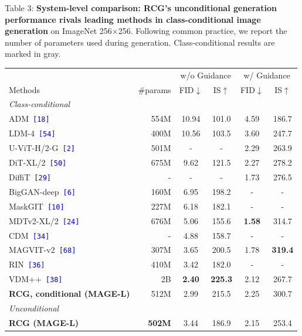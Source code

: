 \documentclass[10pt]{article}
\newcommand{\gc}[1]{\textcolor{resultgray}{#1}}
\begin{document}
\graphicspath{{assets/}}
\noindent\parbox{\linewidth}{Table 3: \textbf{System-level comparison: RCG's unconditional generation performance rivals leading methods in class-conditional image generation} on ImageNet 256$\times$256. Following common practice, we report the number of parameters used during generation. Class-conditional results are marked in gray.}\par
\vspace{6pt}
\centering
\begin{tabular}{@{}lr|cc|cc@{}}
 & & \multicolumn{2}{|c|}{w/o Guidance} & \multicolumn{2}{c}{w/ Guidance} \\
 Methods & \#params & FID$\downarrow$ & IS$\uparrow$ & FID$\downarrow$ & IS$\uparrow$ \\
 \toprule
 \multicolumn{2}{l|}{\textit{Class-conditional}} & & & & \\
 \gc{ADM~\textcolor{blue}{\texttt{[18]}}} & \gc{554M} & \gc{10.94} & \gc{101.0} & \gc{4.59} & \gc{186.7} \\
 \gc{LDM-4~\textcolor{blue}{\texttt{[54]}}} & \gc{400M} & \gc{10.56} & \gc{103.5} & \gc{3.60} & \gc{247.7} \\
 \gc{U-ViT-H/2-G~\textcolor{blue}{\texttt{[2]}}} & \gc{501M} & \gc{-} & \gc{-} & \gc{2.29} & \gc{263.9} \\
 \gc{DiT-XL/2~\textcolor{blue}{\texttt{[50]}}} & \gc{675M} & \gc{9.62} & \gc{121.5} & \gc{2.27} & \gc{278.2} \\
 \gc{DiffiT~\textcolor{blue}{\texttt{[29]}}} & \gc{-} & \gc{-} & \gc{-} & \gc{1.73} & \gc{276.5} \\
 \gc{BigGAN-deep~\textcolor{blue}{\texttt{[6]}}} & \gc{160M} & \gc{6.95} & \gc{198.2} & \gc{-} & \gc{-} \\
 \gc{MaskGIT~\textcolor{blue}{\texttt{[10]}}} & \gc{227M} & \gc{6.18} & \gc{182.1} & \gc{-} & \gc{-} \\
 \gc{MDTv2-XL/2~\textcolor{blue}{\texttt{[24]}}} & \gc{676M} & \gc{5.06} & \gc{155.6} & \gc{\textbf{1.58}} & \gc{314.7} \\
 \gc{CDM~\textcolor{blue}{\texttt{[34]}}} & \gc{-} & \gc{4.88} & \gc{158.7} & \gc{-} & \gc{-} \\
 \gc{MAGVIT-v2~\textcolor{blue}{\texttt{[68]}}} & \gc{307M} & \gc{3.65} & \gc{200.5} & \gc{1.78} & \gc{\textbf{319.4}} \\
   \gc{RIN~\textcolor{blue}{\texttt{[36]}}} & \gc{410M} & \gc{3.42} & \gc{182.0} & \gc{-} & \gc{-} \\
 \gc{VDM++~\textcolor{blue}{\texttt{[38]}}} & \gc{2B} & \gc{\textbf{2.40}} & \gc{\textbf{225.3}} & \gc{2.12} & \gc{267.7} \\
 \gc{\textbf{RCG, conditional (MAGE-L)}} & \gc{512M} & \gc{2.99} & \gc{215.5} & \gc{2.25} & \gc{300.7} \\
 \midrule
 \multicolumn{2}{l|}{\textit{Unconditional}} & & & & \\
  \textbf{RCG (MAGE-L)} & \textbf{502M} & 3.44 & 186.9 & 2.15 & 253.4 \\
\end{tabular}
\end{document}
